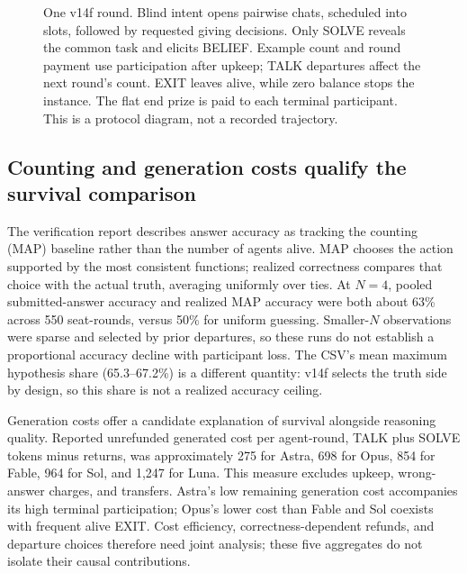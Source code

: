 \begin{figure}[!t]
\centering

\caption{One v14f round. Blind intent opens pairwise chats, scheduled into slots, followed by requested giving decisions. Only SOLVE reveals the common task and elicits BELIEF. Example count and round payment use participation after upkeep; TALK departures affect the next round's count. EXIT leaves alive, while zero balance stops the instance. The flat end prize is paid to each terminal participant. This is a protocol diagram, not a recorded trajectory.}
\label{fig:arena-structure}
\end{figure}


\subsection{Counting and generation costs qualify the survival comparison}\label{sec:arena-costs}
The verification report describes answer accuracy as tracking the counting (MAP) baseline rather than the number of agents alive. MAP chooses the action supported by the most consistent functions; realized correctness compares that choice with the actual truth, averaging uniformly over ties. At $N=4$, pooled submitted-answer accuracy and realized MAP accuracy were both about 63\% across 550 seat-rounds, versus 50\% for uniform guessing. Smaller-$N$ observations were sparse and selected by prior departures, so these runs do not establish a proportional accuracy decline with participant loss. The CSV's mean maximum hypothesis share (65.3--67.2\%) is a different quantity: v14f selects the truth side by design, so this share is not a realized accuracy ceiling.

Generation costs offer a candidate explanation of survival alongside reasoning quality. Reported unrefunded generated cost per agent-round, TALK plus SOLVE tokens minus returns, was approximately 275 for Astra, 698 for Opus, 854 for Fable, 964 for Sol, and 1,247 for Luna. This measure excludes upkeep, wrong-answer charges, and transfers. Astra's low remaining generation cost accompanies its high terminal participation; Opus's lower cost than Fable and Sol coexists with frequent alive EXIT. Cost efficiency, correctness-dependent refunds, and departure choices therefore need joint analysis; these five aggregates do not isolate their causal contributions.

